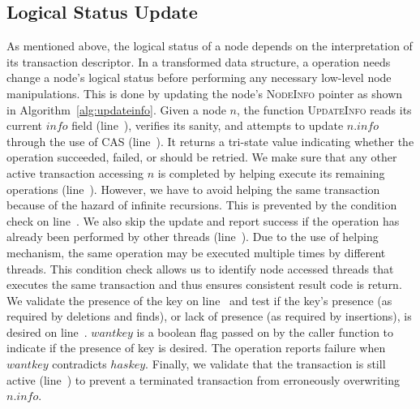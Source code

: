 \documentclass[10pt,conference,compsocconf]{IEEEtran}
\begin{document}
\subsection{Logical Status Update}
\label{sec:logicalupdate}
As mentioned above, the logical status of a node depends on the interpretation of its transaction descriptor. 
In a transformed data structure, a operation needs change a node's logical status before performing any necessary low-level node manipulations. 
This is done by updating the node's \textsc{NodeInfo} pointer as shown in Algorithm~\ref{alg:updateinfo}. 
Given a node $n$, the function \textsc{UpdateInfo} reads its current $info$ field (line~), verifies its sanity, and attempts to update $n.info$ through the use of CAS (line~).
It returns a tri-state value indicating whether the operation succeeded, failed, or should be retried.
We make sure that any other active transaction accessing $n$ is completed by helping execute its remaining operations (line~).
However, we have to avoid helping the same transaction because of the hazard of infinite recursions.
This is prevented by the condition check on line~.
We also skip the update and report success if the operation has already been performed by other threads (line~).
Due to the use of helping mechanism, the same operation may be executed multiple times by different threads.
This condition check allows us to identify node accessed threads that executes the same transaction and thus ensures consistent result code is return.
We validate the presence of the key on line~ and test if the key's presence (as required by deletions and finds), or lack of presence (as required by insertions), is desired on line~.
$wantkey$ is a boolean flag passed on by the caller function to indicate if the presence of key is desired.
The operation reports failure when $wantkey$ contradicts $haskey$.
Finally, we validate that the transaction is still active (line~) to prevent a terminated transaction from erroneously overwriting $n.info$.
\end{document}
